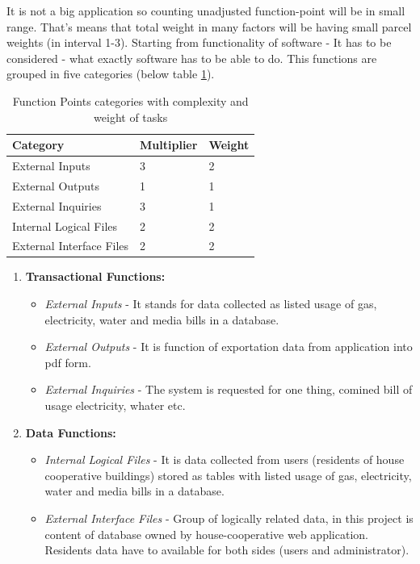 \documentclass[a4paper,11pt,onecolumn,oneside]{book}
\begin{document}
It is not a big application so counting unadjusted function-point will be in small range. That's means that total weight in many factors will be having small parcel weights (in interval 1-3). Starting from functionality of software - It has to be considered - what exactly software has to be able to do. This functions are grouped in five categories (below table \ref{tab111}).

\begin{table}[H]
	\centering
\begin{tabular}{|l|l|l|}
\hline
\rowcolor{pink!80!}\textbf{Category}& \textbf{Multiplier} & \textbf{Weight} \\ \hline
External Inputs          & 3          & 2      \\ \hline
External Outputs         & 1          & 1      \\ \hline
External Inquiries       & 3          & 1      \\ \hline
Internal Logical Files   & 2          & 2      \\ \hline
External Interface Files & 2          & 2      \\ \hline
\end{tabular}
\caption{Function Points categories with complexity and weight of tasks}
 \label{tab111}
\end{table}

  \begin{enumerate}

 \item\textbf{Transactional Functions:}
   \begin{itemize} 
  \item \textit{External Inputs} - It stands for data collected as listed usage of gas, electricity, water and media bills in a database.
  \item \textit{External Outputs} - It is function of exportation data from application into pdf form.
  \item \textit{External Inquiries} - The system is requested for one thing, comined bill of usage electricity, whater etc.
  \end{itemize}
  
\item\textbf{Data Functions:}
  \begin{itemize}
  \item \textit{Internal Logical Files} - It is data collected from users (residents of house cooperative buildings) stored as tables with listed usage of gas, electricity, water and media bills in a database.
  \item \textit{External Interface Files} - Group of logically related data, in this project is content of database owned by house-cooperative web application. Residents data have to available for both sides (users and administrator).
  \end{itemize}  
 
  \end{enumerate}
\end{document}
